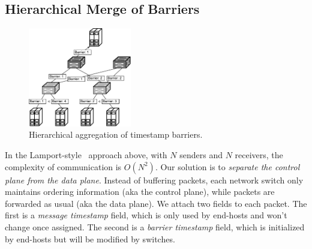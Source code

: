 



\subsection{Hierarchical Merge of Barriers}
\label{sec:ideal}

\begin{figure}[t]
\centering
\includegraphics[width=0.4\textwidth]{images/hierarchical_merge.pdf}
\caption{Hierarchical aggregation of timestamp barriers.}
\label{fig:hierarchical_merge}
\vspace{-0.9em}
\end{figure}

In the Lamport-style~\cite{lamport1978time} approach above, with $N$ senders and $N$ receivers, the complexity of communication is $O(N^2)$.
Our solution is to \textit{separate the control plane from the data plane}.
Instead of buffering packets, each network switch only maintains ordering information (aka the control plane), while packets are forwarded as usual (aka the data plane).
We attach two fields to each packet.
The first is a \textit{message timestamp} field, which is only used by end-hosts and won't change once assigned.
The second is a \textit{barrier timestamp} field, which is initialized by end-hosts but will be modified by switches.


